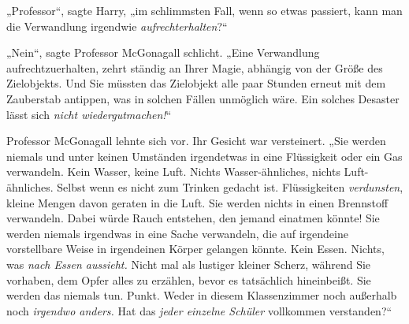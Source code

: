 „Professor“, sagte Harry, „im schlimmsten Fall, wenn so etwas passiert, kann man die Verwandlung irgendwie \emph{aufrechterhalten}?“

„Nein“, sagte Professor McGonagall schlicht.
„Eine Verwandlung aufrechtzuerhalten, zehrt ständig an Ihrer Magie, abhängig von der Größe des Zielobjekts. Und Sie müssten das Zielobjekt alle paar Stunden erneut mit dem Zauberstab antippen, was in solchen Fällen unmöglich wäre. Ein solches Desaster lässt sich \emph{nicht wiedergutmachen!}“

Professor McGonagall lehnte sich vor. Ihr Gesicht war versteinert.
„Sie werden niemals und unter keinen Umständen irgendetwas in eine Flüssigkeit oder ein Gas verwandeln. Kein Wasser, keine Luft. Nichts Wasser-ähnliches, nichts Luft-ähnliches. Selbst wenn es nicht zum Trinken gedacht ist. Flüssigkeiten \emph{verdunsten}, kleine Mengen davon geraten in die Luft. Sie werden nichts in einen Brennstoff verwandeln. Dabei würde Rauch entstehen, den jemand einatmen könnte! Sie werden niemals irgendwas in eine Sache verwandeln, die auf irgendeine vorstellbare Weise in irgendeinen Körper gelangen könnte. Kein Essen. Nichts, was \emph{nach Essen aussieht.} Nicht mal als lustiger kleiner Scherz, während Sie vorhaben, dem Opfer alles zu erzählen, bevor es tatsächlich hineinbeißt. Sie werden das niemals tun. Punkt. Weder in diesem Klassenzimmer noch außerhalb noch \emph{irgendwo anders.} Hat das \emph{jeder einzelne Schüler} vollkommen verstanden?“

